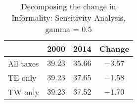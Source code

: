 \documentclass[12pt]{article}
\begin{document}
 \begin{table}[h]
 \caption{Decomposing the change in Informality: Sensitivity Analysis, gamma = 0.5}
 \begin{center}
 \label{results1}
 \begin{tabular}{lccc}
    & 2000 & 2014 & Change \\ \hline
  All taxes &  $39.23$ & $35.66$ & $-3.57$ \\ 
  TE only &  $39.23$ & $37.65$ & $-1.58$ \\ 
  TW only &  $39.23$ & $37.52$ & $-1.70$ \\ 
 \hline
 \end{tabular}
 \end{center}
 \end{table}
 
\end{document}
